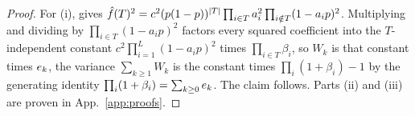 \begin{proof}
For (i), \thmfour{} gives
$\hat f(T)^2 = c^2 (p(1-p))^{|T|} \prod_{i\in T} a_i^2 \prod_{i\notin T}(1-a_ip)^2$. Multiplying and
dividing by $\prod_{i\in T}(1-a_ip)^2$ factors every squared coefficient into the $T$-independent
constant $c^2\prod_{i=1}^{L}(1-a_ip)^2$ times $\prod_{i\in T}\beta_i$, so $W_k$ is that constant times
$e_{k}$, the variance $\sum_{k\ge 1} W_k$ is the constant times $\prod_i(1+\beta_i) - 1$ by the
generating identity $\prod_i(1+\beta_i) = \sum_{k\ge 0}e_{k}$. The claim follows.
Parts (ii) and (iii) are proven in App.~\ref{app:proofs}.
\end{proof}


